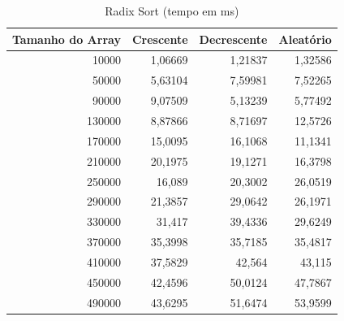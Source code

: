 \documentclass[a4paper, 12pt]{article}
\begin{document}
\begin{longtable}[c]{@{}rrrr@{}}
	\caption{Radix Sort (tempo em ms)}
	\label{tab:radix1-table}\\
	\toprule
	\multicolumn{1}{l}{\textbf{Tamanho do Array}} & \multicolumn{1}{c}{\textbf{Crescente}} & \multicolumn{1}{c}{\textbf{Decrescente}} & \multicolumn{1}{c}{\textbf{Aleatório}} \\* \midrule
	\endfirsthead
	\endhead
	\multicolumn{1}{|r|}{10000} & \multicolumn{1}{r|}{1,06669} & \multicolumn{1}{r|}{1,21837} & \multicolumn{1}{r|}{1,32586} \\* \midrule
	\multicolumn{1}{|r|}{50000} & \multicolumn{1}{r|}{5,63104} & \multicolumn{1}{r|}{7,59981} & \multicolumn{1}{r|}{7,52265} \\* \midrule
	\multicolumn{1}{|r|}{90000} & \multicolumn{1}{r|}{9,07509} & \multicolumn{1}{r|}{5,13239} & \multicolumn{1}{r|}{5,77492} \\* \midrule
	\multicolumn{1}{|r|}{130000} & \multicolumn{1}{r|}{8,87866} & \multicolumn{1}{r|}{8,71697} & \multicolumn{1}{r|}{12,5726} \\* \midrule
	\multicolumn{1}{|r|}{170000} & \multicolumn{1}{r|}{15,0095} & \multicolumn{1}{r|}{16,1068} & \multicolumn{1}{r|}{11,1341} \\* \midrule
	\multicolumn{1}{|r|}{210000} & \multicolumn{1}{r|}{20,1975} & \multicolumn{1}{r|}{19,1271} & \multicolumn{1}{r|}{16,3798} \\* \midrule
	\multicolumn{1}{|r|}{250000} & \multicolumn{1}{r|}{16,089} & \multicolumn{1}{r|}{20,3002} & \multicolumn{1}{r|}{26,0519} \\* \midrule
	\multicolumn{1}{|r|}{290000} & \multicolumn{1}{r|}{21,3857} & \multicolumn{1}{r|}{29,0642} & \multicolumn{1}{r|}{26,1971} \\* \midrule
	\multicolumn{1}{|r|}{330000} & \multicolumn{1}{r|}{31,417} & \multicolumn{1}{r|}{39,4336} & \multicolumn{1}{r|}{29,6249} \\* \midrule
	\multicolumn{1}{|r|}{370000} & \multicolumn{1}{r|}{35,3998} & \multicolumn{1}{r|}{35,7185} & \multicolumn{1}{r|}{35,4817} \\* \midrule
	\multicolumn{1}{|r|}{410000} & \multicolumn{1}{r|}{37,5829} & \multicolumn{1}{r|}{42,564} & \multicolumn{1}{r|}{43,115} \\* \midrule
	\multicolumn{1}{|r|}{450000} & \multicolumn{1}{r|}{42,4596} & \multicolumn{1}{r|}{50,0124} & \multicolumn{1}{r|}{47,7867} \\* \midrule
	\multicolumn{1}{|r|}{490000} & \multicolumn{1}{r|}{43,6295} & \multicolumn{1}{r|}{51,6474} & \multicolumn{1}{r|}{53,9599} \\* \midrule

\end{longtable}
\end{document}
